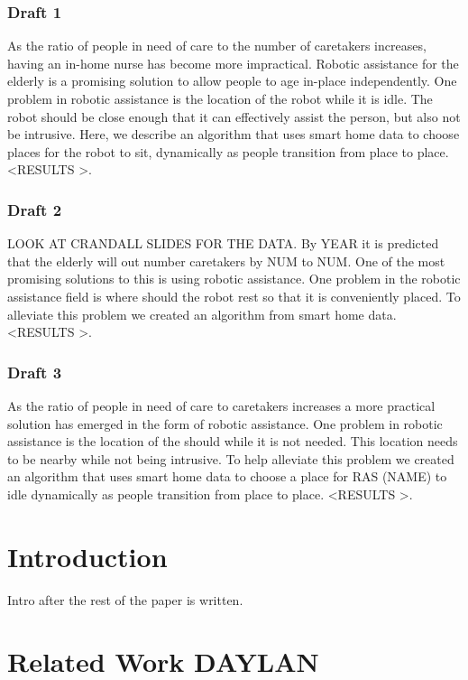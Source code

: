 \documentclass[11pt, conference, a4paper]{IEEEtran}
\begin{document}
\subsubsection{Draft 1}
As the ratio of people in need of care to the number of caretakers increases, having an in-home nurse has become more impractical. Robotic assistance for the elderly is a promising solution to allow people to age in-place independently. One problem in robotic assistance is the location of the robot while it is idle. The robot should be close enough that it can effectively assist the person, but also not be intrusive. Here, we describe an algorithm that uses smart home data to choose places for the robot to sit, dynamically as people transition from place to place. \textless RESULTS \textgreater. 


\subsubsection{Draft 2}
LOOK AT CRANDALL SLIDES FOR THE DATA.
By YEAR it is predicted that the elderly will out number caretakers by NUM to NUM. One of the most promising solutions to this is using robotic assistance. One problem in the robotic assistance field is where should the robot rest so that it is conveniently placed. To alleviate this problem we created an algorithm from smart home data. \textless RESULTS \textgreater. 

\subsubsection{Draft 3}
As the ratio of people in need of care to caretakers increases a more practical solution has emerged in the form of robotic assistance. One problem in robotic assistance is the location of the should while it is not needed. This location needs to be nearby while not being intrusive. To help alleviate this problem we created an algorithm that uses smart home data to choose a place for RAS (NAME) to idle dynamically as people transition from place to place. \textless RESULTS \textgreater. 



\section{Introduction}
Intro after the rest of the paper is written. 


\section{Related Work DAYLAN}
\end{document}
